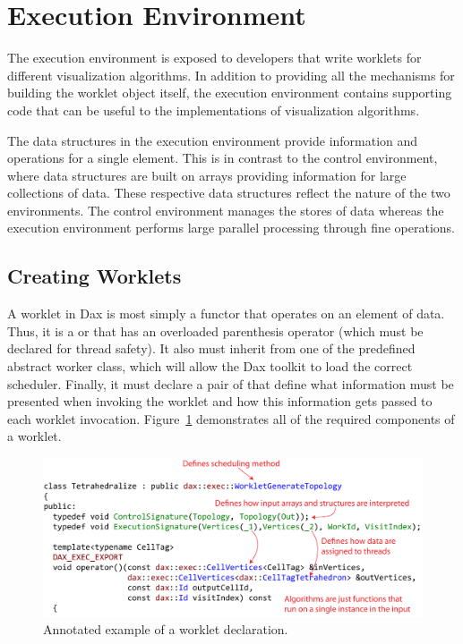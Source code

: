 


\section{Execution Environment}
\label{sec:ExecutionEnvironment}


The execution environment is exposed to developers that write worklets for
different visualization algorithms. In addition to providing all the
mechanisms for building the worklet object itself, the execution
environment contains supporting code that can be useful to the
implementations of visualization algorithms.

The data structures in the execution environment provide information and
operations for a single element. This is in contrast to the control
environment, where data structures are built on arrays providing
information for large collections of data. These respective data structures
reflect the nature of the two environments. The control environment manages
the stores of data whereas the execution environment performs large
parallel processing through fine operations.

\subsection{Creating Worklets}
\label{sec:CreatingWorklets}


A worklet in Dax is most simply a functor that operates on an element of
data. Thus, it is a  or  that has an
overloaded parenthesis operator (which must be declared 
for thread safety). It also must inherit from one of the predefined
abstract worker class, which will allow the Dax toolkit to load the correct
scheduler. Finally, it must declare a pair of
 that define what information must be
presented when invoking the worklet and how this information gets passed to
each worklet invocation. Figure~\ref{fig:WorkletExampleAnnotated}
demonstrates all of the required components of a worklet.

\begin{figure}[htb]
  \includegraphics[width=\linewidth]{images/WorkletExampleAnnotated}
  \caption{Annotated example of a worklet declaration.}
  \label{fig:WorkletExampleAnnotated}
\end{figure}

